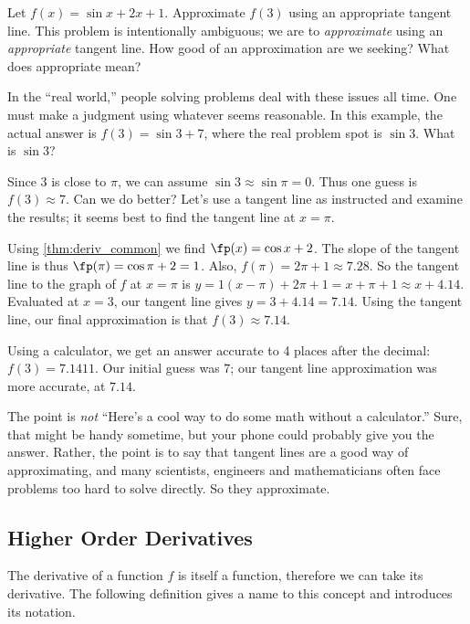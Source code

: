 \begin{example}\label{ex_der2}%
Let $f(x) = \sin x + 2x+1$. Approximate $f(3)$ using an appropriate tangent line.
\solution
This problem is intentionally ambiguous; we are to \emph{approximate} using an \emph{appropriate} tangent line. How good of an approximation are we seeking? What does appropriate mean?

In the ``real world,'' people solving problems deal with these issues all time. One must make a judgment using whatever seems reasonable. In this example, the actual answer is $f(3) = \sin 3 + 7$, where the real problem spot is $\sin 3$. What is $\sin 3$?

Since $3$ is close to $\pi$, we can assume $\sin 3\approx \sin \pi = 0$. Thus one guess is $f(3) \approx 7$. Can we do better? Let's use a tangent line as instructed and examine the results; it seems best to find the tangent line at $x=\pi$. 

Using \autoref{thm:deriv_common} we find $\fp(x) = \cos x + 2$. The slope of the tangent line is thus $\fp(\pi) = \cos \pi + 2 =1$. Also, $f(\pi) = 2\pi+1 \approx 7.28$. So the tangent line to the graph of $f$ at $x=\pi$ is $y=1(x-\pi)+ 2\pi+1 =x+\pi+1 \approx x+4.14$. Evaluated at $x=3$, our tangent line gives $y=3+4.14 = 7.14$. Using the tangent line, our final approximation is that $f(3) \approx 7.14$.

Using a calculator, we get an answer accurate to 4 places after the decimal: $f(3) = 7.1411$. Our initial guess was $7$; our tangent line approximation was more accurate, at $7.14$.

The point is \emph{not} ``Here's a cool way to do some math without a calculator.'' Sure, that might be handy sometime, but your phone could probably give you the answer. Rather, the point is to say that tangent lines are a good way of approximating, and many scientists, engineers and mathematicians often face problems too hard to solve directly. So they approximate.
\end{example}

\subsection{Higher Order Derivatives}

The derivative of a function $f$ is itself a function, therefore we can take its derivative. The following definition gives a name to this concept and introduces its notation.

